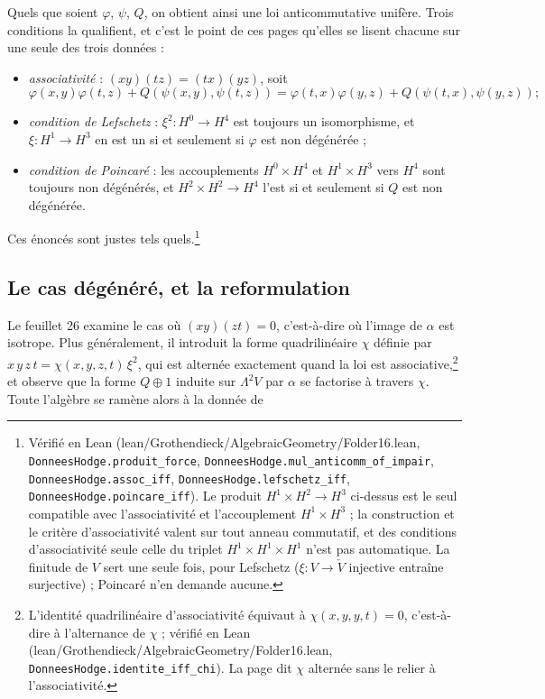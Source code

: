 \documentclass[11pt,a4paper]{article}
\begin{document}
Quels que soient $\varphi$, $\psi$, $Q$, on obtient ainsi une loi
anticommutative unifère. Trois conditions la qualifient, et c'est le point de
ces pages qu'elles se lisent chacune sur une seule des trois données :

\begin{itemize}
  \item \emph{associativité} : $(xy)(tz) = (tx)(yz)$, soit
  \[
  \varphi(x,y)\varphi(t,z) + Q(\psi(x,y), \psi(t,z))
  = \varphi(t,x)\varphi(y,z) + Q(\psi(t,x), \psi(y,z)) ;
  \]
  \item \emph{condition de Lefschetz} : $\xi^{2} \colon H^{0} \to H^{4}$ est
  toujours un isomorphisme, et $\xi \colon H^{1} \to H^{3}$ en est un si et
  seulement si $\varphi$ est non dégénérée ;
  \item \emph{condition de Poincaré} : les accouplements $H^{0} \times H^{4}$
  et $H^{1} \times H^{3}$ vers $H^{4}$ sont toujours non dégénérés, et
  $H^{2} \times H^{2} \to H^{4}$ l'est si et seulement si $Q$ est non
  dégénérée.
\end{itemize}

Ces énoncés sont justes tels quels.\footnote{Vérifié en Lean
(lean/Grothendieck/AlgebraicGeometry/Folder16.lean, \texttt{DonneesHodge.produit\_force},
\texttt{DonneesHodge.mul\_anticomm\_of\_impair}, \texttt{DonneesHodge.assoc\_iff},
\texttt{DonneesHodge.lefschetz\_iff}, \texttt{DonneesHodge.poincare\_iff}). Le
produit $H^{1} \times H^{2} \to H^{3}$ ci-dessus est le seul compatible avec
l'associativité et l'accouplement $H^{1} \times H^{3}$ ; la construction et le
critère d'associativité valent sur tout anneau commutatif, et des conditions
d'associativité seule celle du triplet $H^{1} \times H^{1} \times H^{1}$ n'est
pas automatique. La finitude de $V$ sert une seule fois, pour Lefschetz ($\xi
\colon V \to \check V$ injective entraîne surjective) ; Poincaré n'en demande
aucune.}

\subsection*{Le cas dégénéré, et la reformulation}

Le feuillet 26 examine le cas où $(xy)(zt) = 0$, c'est-à-dire où l'image de
$\alpha$ est isotrope. Plus généralement, il introduit la forme
quadrilinéaire $\chi$ définie par
$x\,y\,z\,t = \chi(x,y,z,t)\,\xi^{2}$, qui est alternée exactement quand la loi
est associative,\footnote{L'identité quadrilinéaire d'associativité équivaut à
$\chi(x,y,y,t) = 0$, c'est-à-dire à l'alternance de $\chi$ ; vérifié en Lean
(lean/Grothendieck/AlgebraicGeometry/Folder16.lean, \texttt{DonneesHodge.identite\_iff\_chi}). La
page dit $\chi$ alternée sans le relier à l'associativité.} et observe que la forme $Q \oplus 1$
induite sur $\Lambda^{2}V$ par $\alpha$ se factorise à travers $\chi$. Toute
l'algèbre se ramène alors à la donnée de
\end{document}
